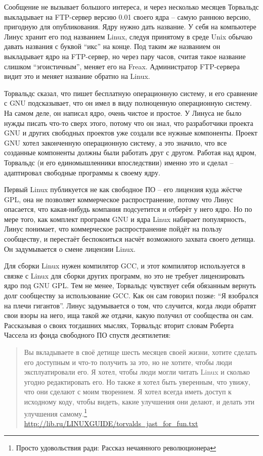 Сообщение не вызывает большого интереса, и через несколько месяцев Торвальдс выкладывает на FTP-сервер версию 0.01 своего ядра -- самую раннюю версию, пригодную для опубликования. Ядру нужно дать название. У себя на компьютере Линус хранит его под названием Linux, следуя принятому в среде Unix обычаю давать названия с буквой \enquote{икс} на конце. Под таким же названием он выкладывает ядро на FTP-сервер, но через пару часов, считая такое название слишком \enquote{эгоистичным}, меняет его на Freax. Администратор FTP-сервера видит это и меняет название обратно на Linux.

Торвальдс сказал, что пишет бесплатную операционную систему, и его сравнение с GNU подсказывает, что он имел в виду полноценную операционную систему. На самом деле, он написал ядро, очень чистое и простое. У Линуса не было нужды писать что-то сверх этого, потому что он знал, что разработчики проекта GNU и других свободных проектов уже создали все нужные компоненты. Проект GNU хотел законченную операционную систему, а это значило, что все созданные компоненты должны были работать друг с другом. Работая над ядром, Торвальдс (и его единомышленники впоследствии) именно это и сделал -- адаптировал свободные программы к своему ядру.

Первый Linux публикуется не как свободное ПО -- его лицензия куда жёстче GPL, она не позволяет коммерческое распространение, потому что Линус опасается, что какая-нибудь компания подсуетится и отберёт у него ядро. Но по мере того, как комплект программ GNU и ядра Linux набирает популярность, Линус понимает, что коммерческое распространение пойдёт на пользу сообществу, и перестаёт беспокоиться насчёт возможного захвата своего детища. Он задумывается о смене лицензии Linux.

Для сборки Linux нужен компилятор GCC, и этот компилятор используется в связке с Linux для сборки других программ, но это не требует лицензировать ядро под GNU GPL. Тем не менее, Торвальдс чувствует себя обязанным вернуть долг сообществу за использование GCC. Как он сам говорил позже: \enquote{Я взобрался на плечи гигантов}. Линус задумывается о том, что случится, когда люди обратят свои взоры на него, ища такой же отдачи, какую получил от сообщества он сам. Рассказывая о своих тогдашних мыслях, Торвальдс вторит словам Роберта Чассела из фонда свободного ПО спустя десятилетия:

\begin{quote}
Вы вкладываете в своё детище шесть месяцев своей жизни, хотите сделать его доступным и что-то получить за это, но не хотите, чтобы люди эксплуатировали его. Я хотел, чтобы люди могли читать Linux и сколько угодно редактировать его. Но также я хотел быть уверенным, что увижу, что они сделают с моим творением. Я хотел всегда иметь доступ к исходному коду, чтобы видеть, какие улучшения они делают, и делать эти улучшения самому.\footnote{Просто удовольствия ради: Рассказ нечаянного революционера} \url{http://lib.ru/LINUXGUIDE/torvalds_jast_for_fun.txt}
\end{quote}

